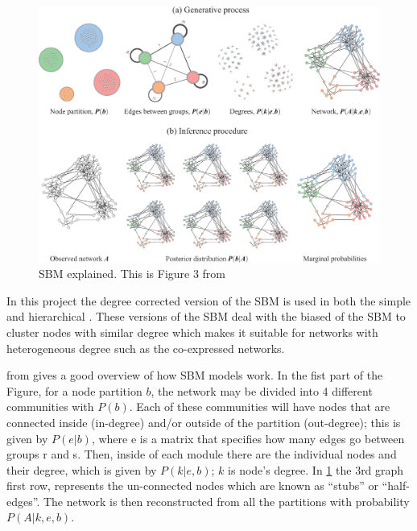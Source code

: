 \begin{figure}[!htb]    
    \centering
    \includegraphics[width=1.0\textwidth,height=1.0\textheight,keepaspectratio]{Sections/Network_I/Resources/dc-sbm_explained.png}
    \caption[Explanation of the Stochastic Block Model]{SBM explained. This is Figure 3 from \citet{Peixoto2021-jx}}
    \label{fig:N_I:dc-sbm_explained}
\end{figure}


In this project the degree corrected version of the SBM is used in both the simple and hierarchical \citet{Karrer2011-si, Peixoto2014-yb}. These versions of the SBM deal with the biased of the SBM to cluster nodes with similar degree which makes it suitable for networks with heterogeneous degree such as the co-expressed networks.


 from \citet{Peixoto2021-jx} gives a good overview of how SBM models work. In the fist part of the Figure, for a node partition $b$, the network may be divided into 4 different communities with $P(b)$. Each of these communities will have nodes that are connected inside (in-degree) and/or outside of the partition (out-degree); this is given by $P(e|b)$, where e is a matrix that specifies how many edges go between groups r and s. Then, inside of each module there are the individual nodes and their degree, which is given by $ P(k|e,b)$; $k$ is node's degree. In \cref{fig:N_I:dc-sbm_explained} the 3rd graph first row, represents the un-connected nodes which are known as “stubs” or “half-edges”. The network is then reconstructed from all the partitions with probability $P(A|k,e,b)$. 

